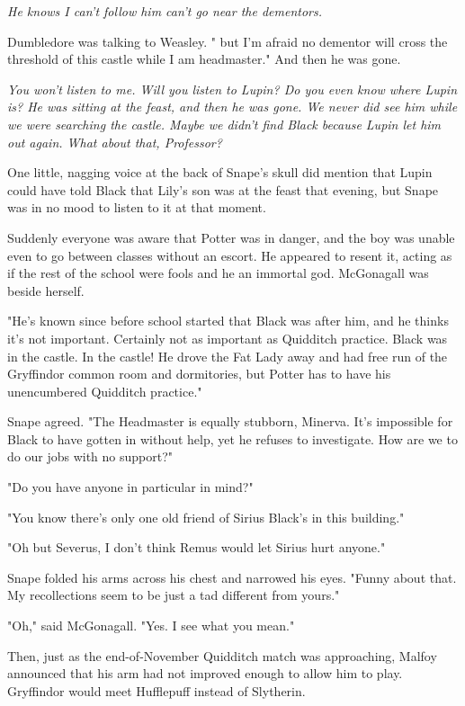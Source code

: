 \emph{He knows I can't follow him{\el} can't go near the dementors.}

Dumbledore was talking to Weasley. "{\el} but I'm afraid no dementor will cross the threshold of this castle while I am headmaster." And then he was gone.

\emph{You won't listen to me. Will you listen to Lupin? Do you even know where Lupin is? He was sitting at the feast, and then he was gone. We never did see him while we were searching the castle. Maybe we didn't find Black because Lupin let him out again. What about that, Professor?}

One little, nagging voice at the back of Snape's skull did mention that Lupin could have told Black that Lily's son was at the feast that evening, but Snape was in no mood to listen to it at that moment.

Suddenly everyone was aware that Potter was in danger, and the boy was unable even to go between classes without an escort. He appeared to resent it, acting as if the rest of the school were fools and he an immortal god. McGonagall was beside herself.

"He's known since before school started that Black was after him, and he thinks it's not important. Certainly not as important as Quidditch practice. Black was in the castle. In the castle! He drove the Fat Lady away and had free run of the Gryffindor common room and dormitories, but Potter has to have his unencumbered Quidditch practice."

Snape agreed. "The Headmaster is equally stubborn, Minerva. It's impossible for Black to have gotten in without help, yet he refuses to investigate. How are we to do our jobs with no support?"

"Do you have anyone in particular in mind?"

"You know there's only one old friend of Sirius Black's in this building."

"Oh but Severus, I don't think Remus would let Sirius hurt anyone."

Snape folded his arms across his chest and narrowed his eyes. "Funny about that. My recollections seem to be just a tad different from yours."

"Oh," said McGonagall. "Yes. I see what you mean."

Then, just as the end-of-November Quidditch match was approaching, Malfoy announced that his arm had not improved enough to allow him to play. Gryffindor would meet Hufflepuff instead of Slytherin.

